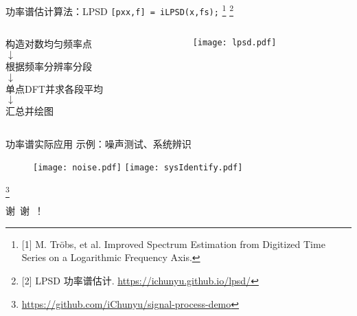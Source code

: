 \documentclass[UTF8]{ctexbeamer}
\begin{document}
\begin{frame}{功率谱估计算法：LPSD}
    \texttt{[pxx,f] = iLPSD(x,fs);}
    \footnote{[1] M. Tröbs, et al. Improved Spectrum Estimation from Digitized Time Series on a Logarithmic Frequency Axis.
    }
    \footnote{[2] LPSD 功率谱估计. \href{https://ichunyu.github.io/lpsd/}{https://ichunyu.github.io/lpsd/}
    }
    
    \vspace{\fill}
    \begin{columns}
        \begin{column}{0.4\textwidth}
            \centering\normalsize
            构造对数均匀频率点 \\
            $\downarrow$ \\
            根据频率分辨率分段 \\
            $\downarrow$ \\
            单点DFT并求各段平均 \\
            $\downarrow$ \\
            汇总并绘图
        \end{column}
        \begin{column}{0.6\textwidth}
            \centering
            \texttt{[image: lpsd.pdf]}
        \end{column}
    \end{columns}
\end{frame}


\begin{frame}{功率谱实际应用}
    示例：噪声测试、系统辨识
    
    \begin{figure}
        \centering
        \texttt{[image: noise.pdf]} 
        \hspace{10pt}
        \texttt{[image: sysIdentify.pdf]} 
    \end{figure}

    \footnote{\href{https://github.com/iChunyu/signal-process-demo}{https://github.com/iChunyu/signal-process-demo}}
\end{frame}



\begin{frame}[standout]
     谢\ 谢\ ！
\end{frame}
\end{document}
